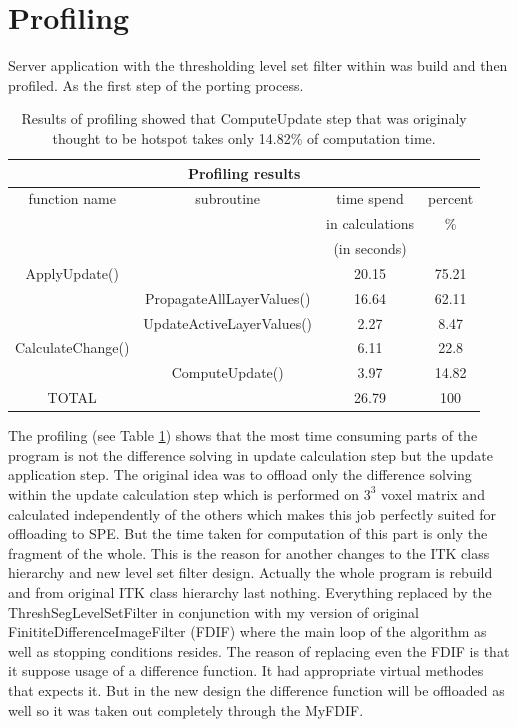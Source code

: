 \section{Profiling}

Server application with the thresholding level set filter within was build and then profiled. As the first step of the porting process.

\begin{table}
\centering
\begin{tabular}{|c|c|c|c|}
\hline
\multicolumn{4}{|c|}{Profiling results}\\
\hline
function name&subroutine&time spend&percent\\&&in calculations&\%\\&&(in seconds)&\\
\hline
\hline
ApplyUpdate()&&20.15&75.21\\
\hline
&PropagateAllLayerValues()&16.64&62.11\\
\hline
&UpdateActiveLayerValues()&2.27&8.47\\
\hline
CalculateChange()&&6.11&22.8\\
\hline
&ComputeUpdate()&3.97&14.82\\
\hline
TOTAL&&26.79&100\\
\hline
\end{tabular}
\par
\caption[Profiling results]
{
  Results of profiling showed that ComputeUpdate step that was originaly thought to be hotspot takes only 14.82\% of computation time.
}
\label{tab:profilingresults}
\end{table}

The profiling (see Table \ref{tab:profilingresults}) shows that the most time consuming parts of the program is not the difference solving in update calculation step but the update application step.
The original idea was to offload only the difference solving within the update calculation step which is performed on $3^3$ voxel matrix and calculated independently of the others which makes this job perfectly suited for offloading to SPE.
But the time taken for computation of this part is only the fragment of the whole.
This is the reason for another changes to the ITK class hierarchy and new level set filter design.
Actually the whole program is rebuild and from original ITK class hierarchy last nothing.
Everything replaced by the ThreshSegLevelSetFilter in conjunction with my version of original FinititeDifferenceImageFilter (FDIF) where the main loop of the algorithm as well as stopping conditions resides.
The reason of replacing even the FDIF is that it suppose usage of a difference function.
It had appropriate virtual methodes that expects it.
But in the new design the difference function will be offloaded as well so it was taken out completely through the MyFDIF.

